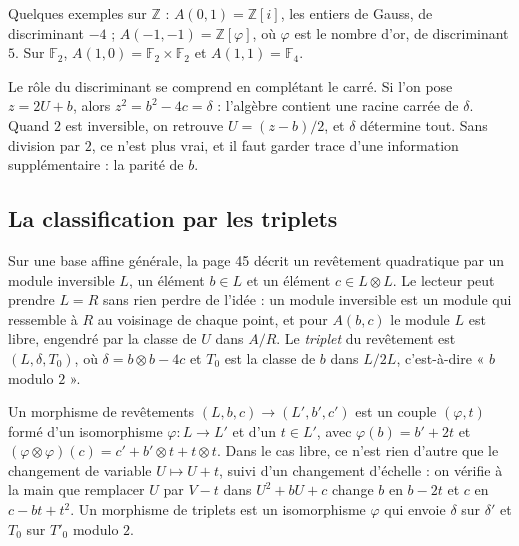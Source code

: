 \documentclass[11pt,a4paper]{amsart}
\theoremstyle{definition}
\theoremstyle{plain}
\theoremstyle{remark}
\theoremstyle{plain}
\newcommand{\Z}{\mathbb Z}
\newcommand{\F}{\mathbb F}
\begin{document}
Quelques exemples sur $\Z$ : $A(0, 1) = \Z[i]$, les entiers de Gauss, de discriminant $-4$ ; $A(-1, -1) = \Z[\varphi]$, où $\varphi$ est le nombre d'or, de discriminant $5$. Sur $\F_2$, $A(1, 0) = \F_2 \times \F_2$ et $A(1, 1) = \F_4$.

Le rôle du discriminant se comprend en complétant le carré. Si l'on pose $z = 2U + b$, alors $z^2 = b^2 - 4c = \delta$ : l'algèbre contient une racine carrée de $\delta$. Quand $2$ est inversible, on retrouve $U = (z - b)/2$, et $\delta$ détermine tout. Sans division par $2$, ce n'est plus vrai, et il faut garder trace d'une information supplémentaire : la parité de $b$.

\subsection{La classification par les triplets}

Sur une base affine générale, la page 45 décrit un revêtement quadratique par un module inversible $L$, un élément $b \in L$ et un élément $c \in L \otimes L$. Le lecteur peut prendre $L = R$ sans rien perdre de l'idée : un module inversible est un module qui ressemble à $R$ au voisinage de chaque point, et pour $A(b, c)$ le module $L$ est libre, engendré par la classe de $U$ dans $A/R$. Le \emph{triplet} du revêtement est $(L, \delta, T_0)$, où $\delta = b \otimes b - 4c$ et $T_0$ est la classe de $b$ dans $L/2L$, c'est-à-dire « $b$ modulo $2$ ».

Un morphisme de revêtements $(L, b, c) \to (L', b', c')$ est un couple $(\varphi, t)$ formé d'un isomorphisme $\varphi \colon L \to L'$ et d'un $t \in L'$, avec $\varphi(b) = b' + 2t$ et $(\varphi\otimes\varphi)(c) = c' + b'\otimes t + t \otimes t$. Dans le cas libre, ce n'est rien d'autre que le changement de variable $U \mapsto U + t$, suivi d'un changement d'échelle : on vérifie à la main que remplacer $U$ par $V - t$ dans $U^2 + bU + c$ change $b$ en $b - 2t$ et $c$ en $c - bt + t^2$. Un morphisme de triplets est un isomorphisme $\varphi$ qui envoie $\delta$ sur $\delta'$ et $T_0$ sur $T'_0$ modulo $2$.
\end{document}

